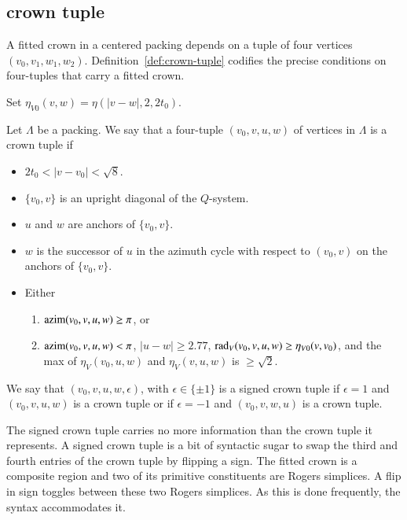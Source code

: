 \subsection{crown tuple}%
    \label{sec:deltaP}


A fitted crown in a centered packing depends on a tuple of
four vertices $(v_0,v_1,w_1,w_2)$.  Definition~\ref{def:crown-tuple} codifies
the precise conditions on four-tuples
that carry a fitted crown.

\begin{definition}[$\eta_{V0}$]\label{def:eta0}
Set $\eta_{V0}(v,w) = \eta(|v-w|,2,2t_0)$. 
\end{definition}



\begin{definition}\label{def:crown-tuple}
Let $\Lambda$ be a packing.
We say that a four-tuple $(v_0,v,u,w)$ of vertices in $\Lambda$   
is a crown tuple if
\begin{itemize}
  \item $2t_0 < |v-v_0| <\sqrt8$.
  \item $\{v_0,v\}$ is an upright diagonal of the $Q$-system.
  \item $u$ and $w$ are anchors of $\{v_0,v\}$.
  \item $w$ is the successor of $u$ in the azimuth cycle with respect to
   $(v_0,v)$ on the
   anchors of $\{v_0,v\}$.
  \item Either
\begin{enumerate}  
    \item  ${\operatorname{azim}}(v_0,v,u,w)\ge\pi$, or
    \item ${\operatorname{azim}}(v_0,v,u,w) <\pi$, 
 $|u-w|\ge 2.77$,
    $\operatorname{rad}_V(v_0,v,u,w)\ge\eta_{V0}(v,v_0)$, and the max of 
    $\eta_V(v_0,u,w)$ and $\eta_V(v,u,w)$ is
    $\ge\sqrt2$.
    \label{enum:wedge2}
\end{enumerate}
\end{itemize}
We say that $(v_0,v,u,w,\epsilon)$, with $\epsilon\in\{\pm1\}$ is
a signed crown tuple if $\epsilon=1$ and $(v_0,v,u,w)$ is a crown tuple
or if $\epsilon=-1$ and $(v_0,v,w,u)$ is a crown tuple.
\end{definition}

The signed crown tuple carries no more information than the crown
tuple it represents.  A signed crown tuple is a bit of
syntactic sugar to swap the third and fourth entries
of the crown tuple by flipping a sign.  The fitted crown is
a composite region and  two of its primitive constituents are
Rogers simplices.   A flip in sign toggles between these two Rogers
simplices.  As this is done frequently, the syntax accommodates it.

